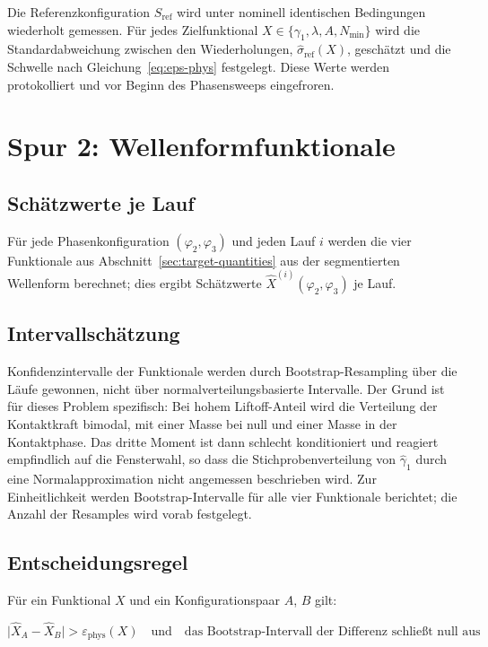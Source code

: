 \documentclass[12pt,a4paper]{report}
\begin{document}
Die Referenzkonfiguration $S_{\mathrm{ref}}$ wird unter nominell
identischen Bedingungen wiederholt gemessen. Für jedes Zielfunktional
$X \in \{\gamma_1, \lambda, A, N_{\min}\}$ wird die Standardabweichung
zwischen den Wiederholungen, $\hat{\sigma}_{\mathrm{ref}}(X)$, geschätzt
und die Schwelle nach Gleichung~\eqref{eq:eps-phys} festgelegt. Diese
Werte werden protokolliert und vor Beginn des Phasensweeps eingefroren.

\section{Spur 2: Wellenformfunktionale}

\subsection{Schätzwerte je Lauf}

Für jede Phasenkonfiguration $(\varphi_2, \varphi_3)$ und jeden Lauf $i$
werden die vier Funktionale aus
Abschnitt~\ref{sec:target-quantities} aus der segmentierten Wellenform
berechnet; dies ergibt Schätzwerte
$\hat{X}^{(i)}(\varphi_2, \varphi_3)$ je Lauf.

\subsection{Intervallschätzung}

Konfidenzintervalle der Funktionale werden durch Bootstrap-Resampling
über die Läufe gewonnen, nicht über normalverteilungsbasierte
Intervalle. Der Grund ist für dieses Problem spezifisch: Bei hohem
Liftoff-Anteil wird die Verteilung der Kontaktkraft bimodal, mit einer
Masse bei null und einer Masse in der Kontaktphase. Das dritte Moment ist
dann schlecht konditioniert und reagiert empfindlich auf die Fensterwahl,
so dass die Stichprobenverteilung von $\hat{\gamma}_1$ durch eine
Normalapproximation nicht angemessen beschrieben wird. Zur Einheitlichkeit
werden Bootstrap-Intervalle für alle vier Funktionale berichtet; die
Anzahl der Resamples wird vorab festgelegt.

\subsection{Entscheidungsregel}

Für ein Funktional $X$ und ein Konfigurationspaar $A$, $B$ gilt:

\begin{equation}
  \bigl| \hat{X}_A - \hat{X}_B \bigr| > \varepsilon_{\mathrm{phys}}(X)
  \quad \text{und} \quad
  \text{das Bootstrap-Intervall der Differenz schließt null aus}
  \label{eq:decision-target}
\end{equation}
\end{document}
